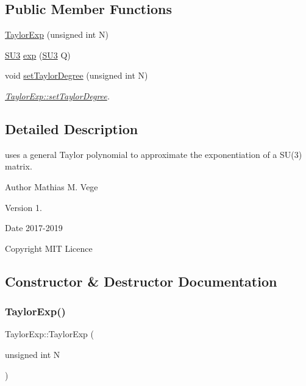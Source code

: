 \subsection*{Public Member Functions}
\begin{DoxyCompactItemize}
\item 
\mbox{\hyperlink{class_taylor_exp_ac8929cf53cb6b8d109220c8284169a82}{Taylor\+Exp}} (unsigned int N)
\item 
\mbox{\hyperlink{class_s_u3}{S\+U3}} \mbox{\hyperlink{class_taylor_exp_a622c4af7d88a43a7bcda97722b62fc82}{exp}} (\mbox{\hyperlink{class_s_u3}{S\+U3}} Q)
\item 
void \mbox{\hyperlink{class_taylor_exp_a6a048363483f372300e412b27f218773}{set\+Taylor\+Degree}} (unsigned int N)
\begin{DoxyCompactList}\small\item\em \mbox{\hyperlink{class_taylor_exp_a6a048363483f372300e412b27f218773}{Taylor\+Exp\+::set\+Taylor\+Degree}}. \end{DoxyCompactList}\end{DoxyCompactItemize}


\subsection{Detailed Description}
uses a general Taylor polynomial to approximate the exponentiation of a S\+U(3) matrix. 

\begin{DoxyAuthor}{Author}
Mathias M. Vege 
\end{DoxyAuthor}
\begin{DoxyVersion}{Version}
1. 
\end{DoxyVersion}
\begin{DoxyDate}{Date}
2017-\/2019 
\end{DoxyDate}
\begin{DoxyCopyright}{Copyright}
M\+IT Licence 
\end{DoxyCopyright}


\subsection{Constructor \& Destructor Documentation}
\mbox{\label{class_taylor_exp_ac8929cf53cb6b8d109220c8284169a82}} 
\subsubsection{\texorpdfstring{TaylorExp()}{TaylorExp()}}
{\footnotesize\ttfamily Taylor\+Exp\+::\+Taylor\+Exp (\begin{DoxyParamCaption}\item[{unsigned int}]{N }\end{DoxyParamCaption})}

